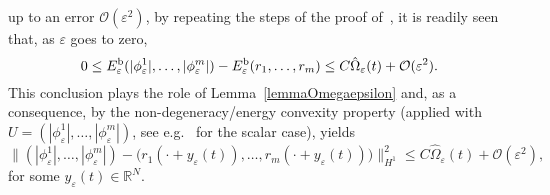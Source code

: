 \documentclass[11pt]{amsart}
\numberwithin{equation}{section}
\theoremstyle{definition}
\begin{document}
up to an error ${\mathcal O}({\varepsilon}^2)$, by repeating the steps of the proof of~\cite[Lemma 3.5]{selvit},
it is readily seen that, as ${\varepsilon}$ goes to zero,
\begin{equation*}
0\leq E_{\varepsilon}^{{\rm b}}(|\phi_{\varepsilon}^1|,\dots,|\phi_{\varepsilon}^m|)-E_{\varepsilon}^{{\rm b}}(r_1,\dots,r_m)\leq C\hat\Omega_{\varepsilon}(t)+{\mathcal O}({\varepsilon}^2).
\end{equation*}
This conclusion plays the role of Lemma~\ref{lemmaOmegaepsilon} and, as a consequence,
by the non-degeneracy/energy convexity property (applied with $U=(|\phi_{\varepsilon}^1|,\dots,|\phi_{\varepsilon}^m|)$,
see e.g.~\cite[Proposition 1]{bronski} for the scalar case), yields
\begin{equation}
	\label{estcruc0}
\|(|\phi_{\varepsilon}^1|,\dots,|\phi_{\varepsilon}^m|)-(r_1(\cdot +y_{\varepsilon}(t)), \dots,r_m(\cdot +y_{\varepsilon}(t))\big) \|_{H^1}^{2}
\leq C\hat\Omega_{\varepsilon}(t)+{\mathcal O}({\varepsilon}^2),
\end{equation}
for some $y_{\varepsilon}(t)\in{{\mathbb R}}^N$.
\end{document}
